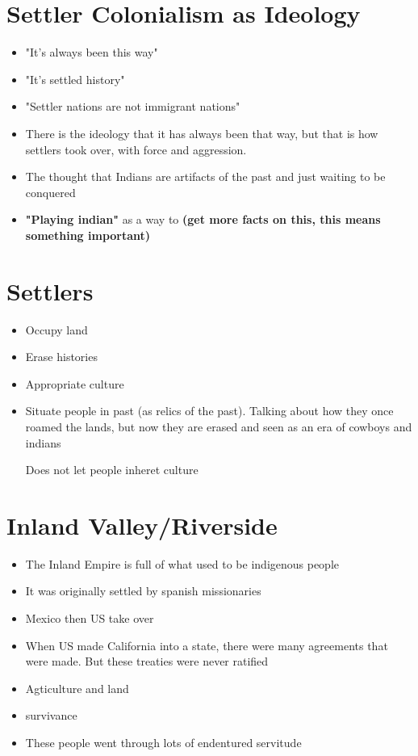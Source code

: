 \documentclass{article}
\begin{document}
\section*{Settler Colonialism as Ideology}
\begin{itemize}
  \item "It's always been this way"
  \item "It's settled history"
  \item "Settler nations are not immigrant nations"
  \item There is the ideology that it has always been that way,
    but that is how settlers took over, with force and aggression.
  \item The thought that Indians are artifacts of the past and just waiting to be conquered
  \item \textbf{"Playing indian"} as a way to \textbf{(get more facts on this, this means something important)}
\end{itemize}

\section*{Settlers}
\begin{itemize}
  \item Occupy land
  \item Erase histories
  \item Appropriate culture
  \item Situate people in past (as relics of the past).
    Talking about how they once roamed the lands, but now they are erased
    and seen as an era of cowboys and indians

    Does not let people inheret culture
\end{itemize}

\section*{Inland Valley/Riverside}
\begin{itemize}
  \item The Inland Empire is full of what used to be indigenous people
  \item It was originally settled by spanish missionaries
  \item Mexico then US take over
  \item When US made California into a state, there were many agreements
    that were made. But these treaties were never ratified
  \item Agticulture and land
  \item survivance
  \item These people went through lots of endentured servitude
\end{itemize}
\end{document}
